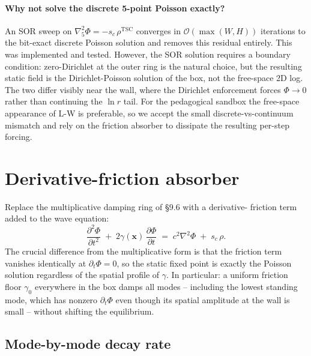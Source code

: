 \documentclass[11pt,a4paper]{article}
\newcommand{\vv}[1]{\mathbf{#1}}
\newcommand{\order}[1]{\mathcal{O}(#1)}
\begin{document}
\paragraph{Why not solve the discrete 5-point Poisson exactly?}  An
SOR sweep on $\nabla^2_5 \Phi = -s_c\,\rho^\text{TSC}$ converges in
$\order{\max(W,H)}$ iterations to the bit-exact discrete Poisson
solution and removes this residual entirely.  This was implemented
and tested.  However, the SOR solution requires a boundary
condition: zero-Dirichlet at the outer ring is the natural choice,
but the resulting static field is the Dirichlet-Poisson solution of
the box, not the free-space 2D log.  The two differ visibly near
the wall, where the Dirichlet enforcement forces $\Phi \to 0$ rather
than continuing the $\ln r$ tail.  For the pedagogical sandbox the
free-space appearance of L-W is preferable, so we accept the small
discrete-vs-continuum mismatch and rely on the friction absorber to
dissipate the resulting per-step forcing.

\section{Derivative-friction absorber}
\label{sec:friction}

Replace the multiplicative damping ring of \S 9.6 with a derivative-
friction term added to the wave equation:
\begin{equation}
  \frac{\partial^2 \Phi}{\partial t^2} \;+\; 2\gamma(\vv{x})\,\frac{\partial \Phi}{\partial t}
  \;=\; c^2\nabla^2 \Phi \;+\; s_c\,\rho.
  \label{eq:friction_pde}
\end{equation}
The crucial difference from the multiplicative form is that the
friction term vanishes identically at $\partial_t \Phi = 0$, so the
static fixed point is exactly the Poisson solution regardless of the
spatial profile of $\gamma$.  In particular: a uniform friction floor
$\gamma_0$ everywhere in the box damps all modes -- including the
lowest standing mode, which has nonzero $\partial_t \Phi$ even though
its spatial amplitude at the wall is small -- without shifting the
equilibrium.

\subsection{Mode-by-mode decay rate}
\end{document}
